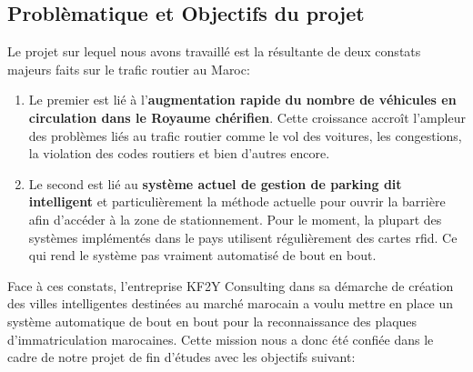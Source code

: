     \subsection{Problèmatique et Objectifs du projet}
    Le projet sur lequel nous avons travaillé est la résultante de deux constats majeurs faits sur le trafic routier au Maroc:
    \begin{enumerate}
            \item Le premier est lié à l’\textbf{augmentation rapide du nombre de véhicules en circulation dans le Royaume chérifien}.  Cette croissance accroît l’ampleur des problèmes liés au trafic routier comme le vol des voitures, les congestions, la violation des codes routiers et bien d’autres encore. 
            \item Le second  est lié au \textbf{système actuel de gestion de parking dit intelligent} et particulièrement la méthode actuelle pour ouvrir la barrière afin d'accéder à la zone de stationnement. Pour le moment, la plupart des systèmes implémentés dans le pays utilisent régulièrement des cartes \acrshort{rfid}. Ce qui rend le système pas vraiment automatisé de bout en bout.
        \end{enumerate}
    Face à ces constats, l’entreprise KF2Y Consulting dans sa démarche de création des villes intelligentes destinées au marché marocain a voulu mettre en place un système automatique de bout en bout pour la reconnaissance des plaques d’immatriculation marocaines.  Cette mission nous a donc été confiée dans le cadre de notre projet de fin d'études avec les objectifs suivant:
